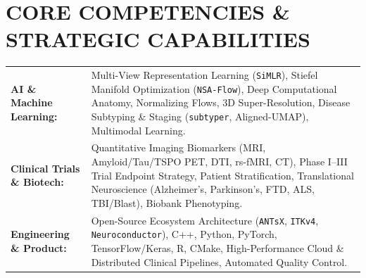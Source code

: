 \documentclass[10pt,letterpaper]{article}
\begin{document}
\vspace{4pt}
\noindent
{}
\vspace{-3pt}

\section{CORE COMPETENCIES \& STRATEGIC CAPABILITIES}
{\footnotesize
\begin{tabularx}{\textwidth}{@{} l X @{}}
  \textbf{\color{primary}AI \& Machine Learning:} & Multi-View Representation Learning (\texttt{SiMLR}), Stiefel Manifold Optimization (\texttt{NSA-Flow}), Deep Computational Anatomy, Normalizing Flows, 3D Super-Resolution, Disease Subtyping \& Staging (\texttt{subtyper}, Aligned-UMAP), Multimodal Learning. \\[1.5pt]
  \textbf{\color{primary}Clinical Trials \& Biotech:} & Quantitative Imaging Biomarkers (MRI, Amyloid/Tau/TSPO PET, DTI, rs-fMRI, CT), Phase I--III Trial Endpoint Strategy, Patient Stratification, Translational Neuroscience (Alzheimer's, Parkinson's, FTD, ALS, TBI/Blast), Biobank Phenotyping. \\[1.5pt]
  \textbf{\color{primary}Engineering \& Product:} & Open-Source Ecosystem Architecture (\texttt{ANTsX}, \texttt{ITKv4}, \texttt{Neuroconductor}), C++, Python, PyTorch, TensorFlow/Keras, R, CMake, High-Performance Cloud \& Distributed Clinical Pipelines, Automated Quality Control.
\end{tabularx}
}
\end{document}
